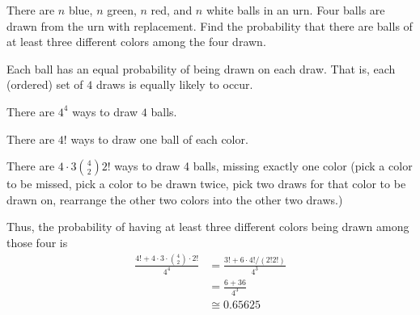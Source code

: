 \begin{problem}[Handout 2, \# 19]
  There are \(n\) blue, \(n\) green, \(n\) red, and \(n\) white balls in an
  urn. Four balls are drawn from the urn with replacement. Find the
  probability that there are balls of at least three different colors among
  the four drawn.
\end{problem}
\begin{solution}
  Each ball has an equal probability of being drawn on each draw. That is,
  each (ordered) set of \(4\) draws is equally likely to occur.

  There are $4^4$ ways to draw $4$ balls.

  There are $4!$ ways to draw one ball of each color.

  There are $\displaystyle 4\cdot 3\binom{4}{2}2!$ ways to draw 4 balls,
  missing exactly one color (pick a color to be missed, pick a color to be
  drawn twice, pick two draws for that color to be drawn on, rearrange the
  other two colors into the other two draws.)

  Thus, the probability of having at least three different colors being
  drawn among those four is
\begin{align*}
  \frac{\displaystyle 4! + 4 \cdot 3 \cdot \binom{4}{2} \cdot 2!}{4^4} &= \frac{3!+6 \cdot 4!/(2!2!)}{4^3} \\
                                                                       &= \frac{6+36}{4^3}\\
                                                                       &\cong 0.65625\\
\end{align*}
\end{solution}

